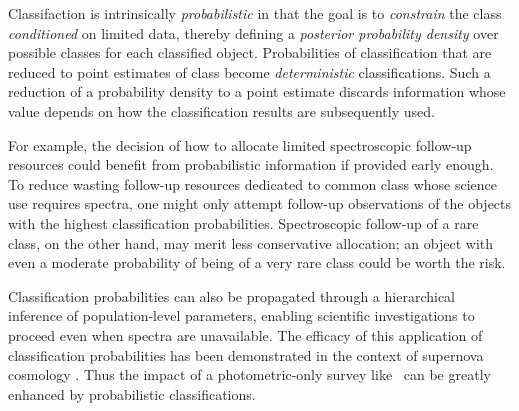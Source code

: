 Classifaction is intrinsically \textit{probabilistic} in that the goal is to \textit{constrain} the class \textit{conditioned} on limited data, thereby defining a \textit{posterior probability density} over possible classes for each classified object.
Probabilities of classification that are reduced to point estimates of class become \textit{deterministic} classifications.
Such a reduction of a probability density to a point estimate discards information whose value depends on how the classification results are subsequently used.

For example, the decision of how to allocate limited spectroscopic follow-up resources could benefit from probabilistic information if provided early enough.
To reduce wasting follow-up resources dedicated to common class whose science use requires spectra, one might only attempt follow-up observations of the objects with the highest classification probabilities.
Spectroscopic follow-up of a rare class, on the other hand, may merit less conservative allocation; an object with even a moderate probability of being of a very rare class could be worth the risk.

Classification probabilities can also be propagated through a hierarchical inference of population-level parameters, enabling scientific investigations to proceed even when spectra are unavailable.
The efficacy of this application of classification probabilities has been demonstrated in the context of supernova cosmology \citep{roberts_zbeams:_2017}.
Thus the impact of a photometric-only survey like \lsst\ can be greatly enhanced by probabilistic classifications.

